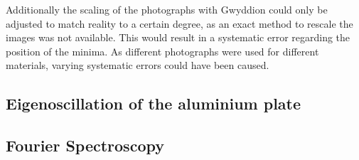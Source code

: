 Additionally the scaling of the photographs with Gwyddion could only be adjusted to match reality to a certain degree, as an exact method to rescale the images was not available. This would result in a systematic error regarding the position of the minima. As different photographs were used for different materials, varying systematic errors could have been caused.

\subsection{Eigenoscillation of the aluminium plate}

\subsection{Fourier Spectroscopy}
